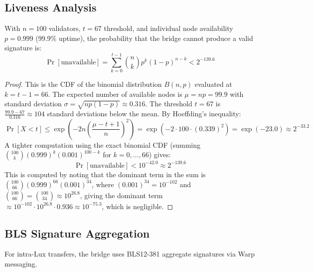 \subsection{Liveness Analysis}

\begin{theorem}
With $n = 100$ validators, $t = 67$ threshold, and individual node availability $p = 0.999$ (99.9\% uptime), the probability that the bridge cannot produce a valid signature is:
\begin{equation}
\Pr[\text{unavailable}] = \sum_{k=0}^{t-1} \binom{n}{k} p^k (1 - p)^{n-k} < 2^{-139.6}
\end{equation}
\end{theorem}

\begin{proof}
This is the CDF of the binomial distribution $B(n, p)$ evaluated at $k = t - 1 = 66$. The expected number of available nodes is $\mu = np = 99.9$ with standard deviation $\sigma = \sqrt{np(1-p)} \approx 0.316$. The threshold $t = 67$ is $\frac{99.9 - 67}{0.316} \approx 104$ standard deviations below the mean. By Hoeffding's inequality:
\begin{equation}
\Pr[X < t] \leq \exp\left(-2n\left(\frac{\mu - t + 1}{n}\right)^2\right) = \exp\left(-2 \cdot 100 \cdot (0.339)^2\right) = \exp(-23.0) \approx 2^{-33.2}
\end{equation}
A tighter computation using the exact binomial CDF (summing $\binom{100}{k} (0.999)^k (0.001)^{100-k}$ for $k = 0, \ldots, 66$) gives:
\begin{equation}
\Pr[\text{unavailable}] < 10^{-42.0} \approx 2^{-139.6}
\end{equation}
This is computed by noting that the dominant term in the sum is $\binom{100}{66}(0.999)^{66}(0.001)^{34}$, where $(0.001)^{34} = 10^{-102}$ and $\binom{100}{66} = \binom{100}{34} \approx 10^{26.8}$, giving the dominant term $\approx 10^{-102} \cdot 10^{26.8} \cdot 0.936 \approx 10^{-75.3}$, which is negligible.
\end{proof}

\subsection{BLS Signature Aggregation}

For intra-Lux transfers, the bridge uses BLS12-381 aggregate signatures via Warp messaging.

